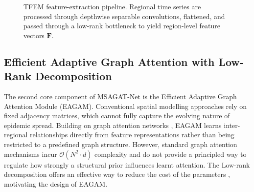 \documentclass[final,1p,times]{elsarticle}
\begin{document}
\begin{figure}[!htbp]
{%
}
\caption{TFEM feature-extraction pipeline. Regional time series are processed through depthwise separable convolutions, flattened, and passed through a low-rank bottleneck to yield region-level feature vectors $\mathbf{F}$.}
\label{fig:feature_extraction}
\end{figure}

\subsection{Efficient Adaptive Graph Attention with Low-Rank Decomposition}

The second core component of MSAGAT-Net is the Efficient Adaptive Graph Attention Module (EAGAM). Conventional spatial modelling approaches rely on fixed adjacency matrices, which cannot fully capture the evolving nature of epidemic spread. Building on graph attention networks \cite{velickovic2017graph}, EAGAM learns inter-regional relationships directly from feature representations rather than being restricted to a predefined graph structure. However, standard graph attention mechanisms incur $\mathcal{O}(N^2 \cdot d)$ complexity and do not provide a principled way to regulate how strongly a structural prior influences learnt attention. The Low-rank decomposition offers an effective way to reduce the cost of the parameters \cite{puny2020global, kong2023low, yang2023self}, motivating the design of EAGAM.
\end{document}
